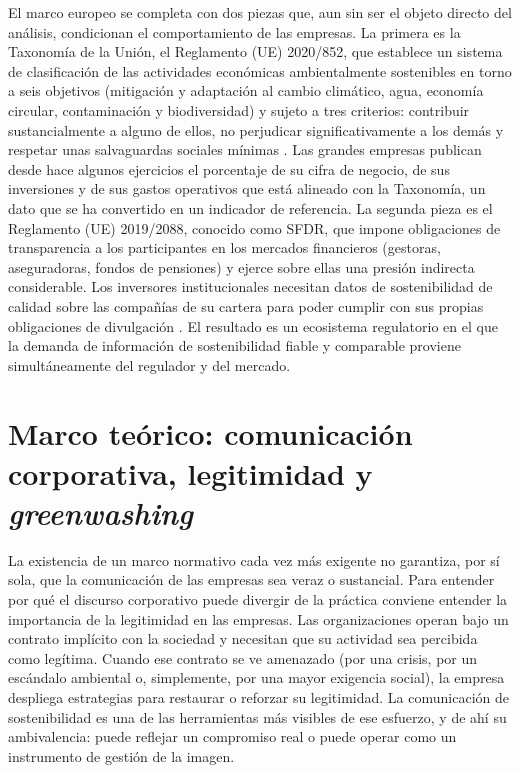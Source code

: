 El marco europeo se completa con dos piezas que, aun sin ser el objeto directo del análisis,
condicionan el comportamiento de las empresas. La primera es la Taxonomía de la Unión, el
Reglamento (UE) 2020/852, que establece un sistema de clasificación de las actividades
económicas ambientalmente sostenibles en torno a seis objetivos (mitigación y adaptación al
cambio climático, agua, economía circular, contaminación y biodiversidad) y sujeto a tres
criterios: contribuir sustancialmente a alguno de ellos, no perjudicar significativamente a
los demás y respetar unas salvaguardas sociales mínimas \parencite{taxonomia2020}. Las grandes empresas publican desde hace algunos ejercicios
el porcentaje de su cifra de negocio, de sus inversiones y de sus gastos operativos que está
alineado con la Taxonomía, un dato que se ha convertido en un indicador de referencia. La
segunda pieza es el Reglamento (UE) 2019/2088, conocido como SFDR, que impone obligaciones de
transparencia a los participantes en los mercados financieros (gestoras, aseguradoras, fondos
de pensiones) y ejerce sobre ellas una presión indirecta considerable. Los inversores institucionales necesitan datos
de sostenibilidad de calidad sobre las compañías de su cartera para poder cumplir con sus
propias obligaciones de divulgación \parencite{sfdr2019}. El resultado es un ecosistema
regulatorio en el que la demanda de información de sostenibilidad fiable y comparable proviene
simultáneamente del regulador y del mercado.

\section{Marco teórico: comunicación corporativa, legitimidad y \textit{greenwashing}}
\label{sec:teoria}

La existencia de un marco normativo cada vez más exigente no garantiza, por sí sola, que la
comunicación de las empresas sea veraz o sustancial. Para entender por qué el discurso
corporativo puede divergir de la práctica conviene entender la importancia de la legitimidad en las empresas. 
Las organizaciones operan bajo un contrato implícito con la sociedad y necesitan que su actividad sea percibida como legítima.
Cuando ese contrato se ve amenazado (por una crisis,
por un escándalo ambiental o, simplemente, por una mayor exigencia social), la empresa
despliega estrategias para restaurar o reforzar su legitimidad. La comunicación de
sostenibilidad es una de las herramientas más visibles de ese esfuerzo, y de ahí su ambivalencia:
puede reflejar un compromiso real o puede operar como un instrumento de gestión de la imagen.

